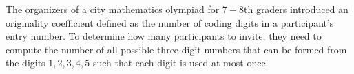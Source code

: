 The organizers of a city mathematics olympiad for $7-8$th graders introduced an originality coefficient defined as the number of coding digits in a participant's entry number. To determine how many participants to invite, they need to compute the number of all possible three-digit numbers that can be formed from the digits $1, 2, 3, 4, 5$ such that each digit is used at most once.
